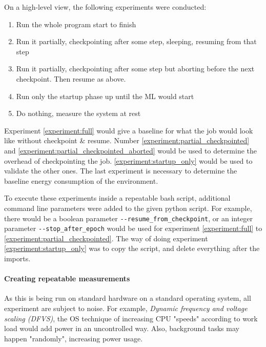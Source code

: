 On a high-level view, the following experiments were conducted: 

\begin{enumerate}
    \item \label{experiment:full}Run the whole program start to finish
    \item \label{experiment:partial_checkpointed}Run it partially, checkpointing after some step, sleeping, resuming from that step
    \item \label{experiment:partial_checkpointed_aborted}Run it partially, checkpointing after some step but aborting before the next checkpoint. Then resume as above.
    \item \label{experiment:startup_only}Run only the startup phase up until the ML would start
    \item \label{experiment:baseline}Do nothing, measure the system at rest
\end{enumerate}

Experiment \ref{experiment:full} would give a baseline for what the job would look like without checkpoint \& resume. Number \ref{experiment:partial_checkpointed} and \ref{experiment:partial_checkpointed_aborted} would be used to determine the overhead of checkpointing the job. \ref{experiment:startup_only} would be used to validate the other ones. The last experiment is necessary to determine the baseline energy consumption of the environment.

To execute these experiments inside a repeatable bash script, additional command line parameters were added to the given python script. 
For example, there would be a boolean parameter \verb|--resume_from_checkpoint|, or an integer parameter \verb|--stop_after_epoch| would be used for experiment \ref{experiment:full} to \ref{experiment:partial_checkpointed}. 
The way of doing experiment \ref{experiment:startup_only} was to copy the script, and delete everything after the imports.

\paragraph{Creating repeatable measurements}

As this is being run on standard hardware on a standard operating system, all experiment are subject to noise. 
For example, \emph{Dynamic frequency and voltage scaling (DFVS)}, the OS technique of increasing CPU "speeds" according to work load would add power in an uncontrolled way. Also, background tasks may happen "randomly", increasing power usage. 

